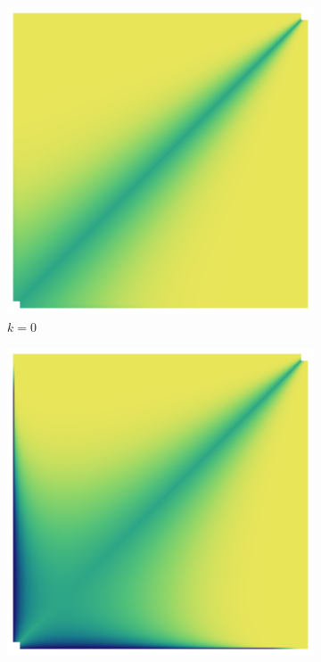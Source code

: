 \documentclass{article}
\theoremstyle{definition}
\begin{document}
\begin{figure}[H]
    \centering
    \begin{subfigure}[b]{0.130\textwidth}
        \includegraphics[width=\textwidth]{img/BinomialBayesian_ppk_6_0.png}
        \caption{$k=0$}
        \label{fig:ppkBG_6_0}
    \end{subfigure}
    \hspace{0.00\textwidth} %
    \begin{subfigure}[b]{0.130\textwidth}
        \includegraphics[width=\textwidth]{img/BinomialBayesian_ppk_6_1.png}

\end{subfigure}
\end{figure}
\end{document}
